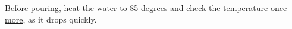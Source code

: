 Before pouring, \uline{heat the water to 85 degrees and check the temperature
once more}, as it drops quickly.

